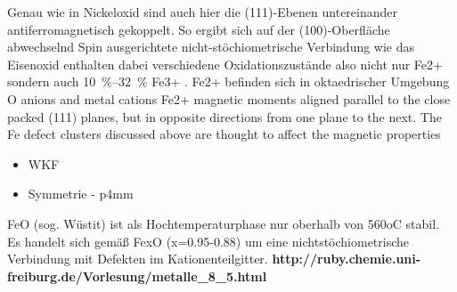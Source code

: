             Genau wie in Nickeloxid sind auch hier die (111)-Ebenen untereinander antiferromagnetisch gekoppelt.
            So ergibt sich auf der (100)-Oberfläche abwechselnd Spin ausgerichtete
            nicht-stöchiometrische Verbindung wie das Eisenoxid enthalten dabei verschiedene Oxidationszustände also nicht nur Fe2+ sondern auch \SIrange{10}{32}{\percent} Fe3+ \cite{FeO_11}.
            Fe2+ befinden sich in oktaedrischer Umgebung
            O anions and metal cations
            Fe2+ magnetic moments aligned parallel to the close packed (111) planes, but in opposite directions from one plane to the next. The Fe defect clusters discussed above are thought to affect the magnetic properties 

            \begin{itemize}
                \item WKF
                \item Symmetrie - p4mm
            \end{itemize}
            FeO (sog. Wüstit) ist als Hochtemperaturphase nur oberhalb von 560oC stabil.
            Es handelt sich gemäß FexO (x=0.95-0.88) um eine nichtstöchiometrische Verbindung mit Defekten im Kationenteilgitter. \textbf{http://ruby.chemie.uni-freiburg.de/Vorlesung/metalle_8_5.html}
    

